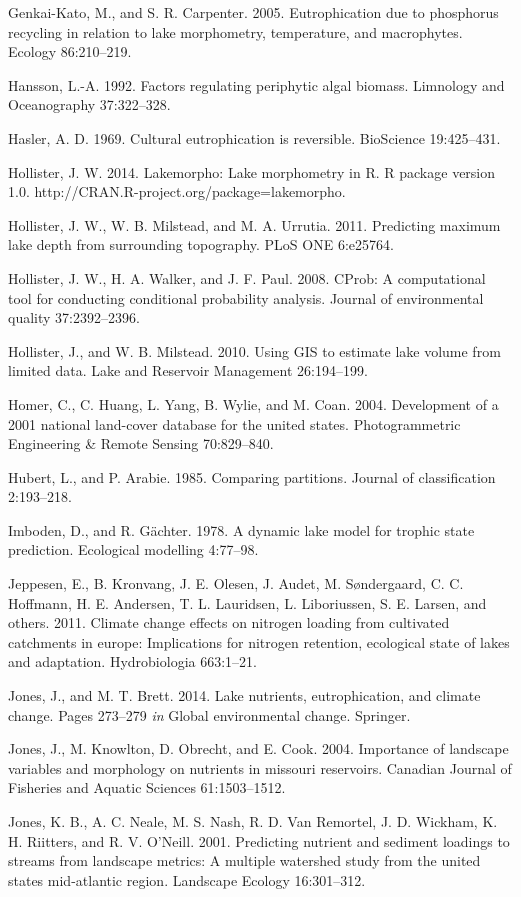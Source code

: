 \documentclass[12pt,]{article}
\begin{document}
Genkai-Kato, M., and S. R. Carpenter. 2005. Eutrophication due to
phosphorus recycling in relation to lake morphometry, temperature, and
macrophytes. Ecology 86:210--219.

Hansson, L.-A. 1992. Factors regulating periphytic algal biomass.
Limnology and Oceanography 37:322--328.

Hasler, A. D. 1969. Cultural eutrophication is reversible. BioScience
19:425--431.

Hollister, J. W. 2014. Lakemorpho: Lake morphometry in R. R package
version 1.0. http://CRAN.R-project.org/package=lakemorpho.

Hollister, J. W., W. B. Milstead, and M. A. Urrutia. 2011. Predicting
maximum lake depth from surrounding topography. PLoS ONE 6:e25764.

Hollister, J. W., H. A. Walker, and J. F. Paul. 2008. CProb: A
computational tool for conducting conditional probability analysis.
Journal of environmental quality 37:2392--2396.

Hollister, J., and W. B. Milstead. 2010. Using GIS to estimate lake
volume from limited data. Lake and Reservoir Management 26:194--199.

Homer, C., C. Huang, L. Yang, B. Wylie, and M. Coan. 2004. Development
of a 2001 national land-cover database for the united states.
Photogrammetric Engineering \& Remote Sensing 70:829--840.

Hubert, L., and P. Arabie. 1985. Comparing partitions. Journal of
classification 2:193--218.

Imboden, D., and R. G{ä}chter. 1978. A dynamic lake model for trophic
state prediction. Ecological modelling 4:77--98.

Jeppesen, E., B. Kronvang, J. E. Olesen, J. Audet, M. S{ø}ndergaard, C.
C. Hoffmann, H. E. Andersen, T. L. Lauridsen, L. Liboriussen, S. E.
Larsen, and others. 2011. Climate change effects on nitrogen loading
from cultivated catchments in europe: Implications for nitrogen
retention, ecological state of lakes and adaptation. Hydrobiologia
663:1--21.

Jones, J., and M. T. Brett. 2014. Lake nutrients, eutrophication, and
climate change. Pages 273--279 \emph{in} Global environmental change.
Springer.

Jones, J., M. Knowlton, D. Obrecht, and E. Cook. 2004. Importance of
landscape variables and morphology on nutrients in missouri reservoirs.
Canadian Journal of Fisheries and Aquatic Sciences 61:1503--1512.

Jones, K. B., A. C. Neale, M. S. Nash, R. D. Van Remortel, J. D.
Wickham, K. H. Riitters, and R. V. O'Neill. 2001. Predicting nutrient
and sediment loadings to streams from landscape metrics: A multiple
watershed study from the united states mid-atlantic region. Landscape
Ecology 16:301--312.
\end{document}
